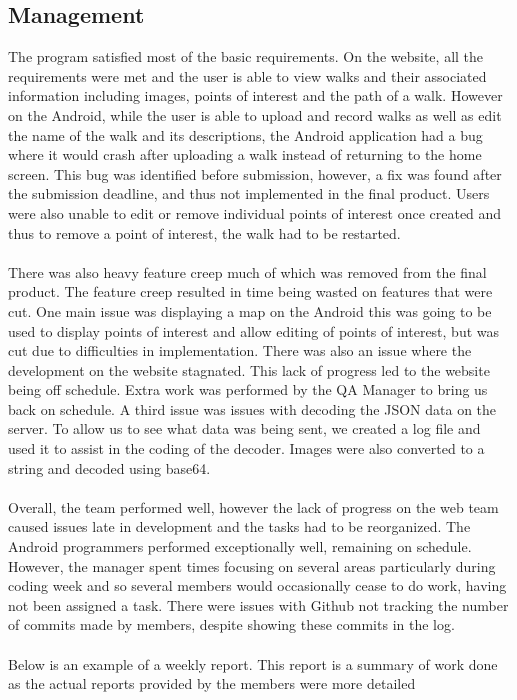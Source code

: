 \documentclass[12pt]{article}
\begin{document}
\subsection{Management}
The program satisfied most of the basic requirements. On the website, all the requirements were met and the user is able to view walks and their associated information including images, points of interest and the path of a walk. However on the Android, while the user is able to upload and record walks as well as edit the name of the walk and its descriptions, the Android application had a bug where it would crash after uploading a walk instead of returning to the home screen. This bug was identified before submission, however, a fix was found after the submission deadline, and thus not implemented in the final product. Users were also unable to edit or remove individual points of interest once created and thus to remove a point of interest, the walk had to be restarted. 
\\\\
There was also heavy feature creep much of which was removed from the final product. The feature creep resulted in time being wasted on features that were cut. One main issue was displaying a map on the Android this was going to be used to display points of interest and allow editing of points of interest, but was cut due to difficulties in implementation. There was also an issue where the development on the website stagnated. This lack of progress led to the website being off schedule. Extra work was performed by the QA Manager to bring us back on schedule. A third issue was issues with decoding the JSON data on the server. To allow us to see what data was being sent, we created a log file and used it to assist in the coding of the decoder. Images were also converted to a string and decoded using base64.
\\\\
Overall, the team performed well, however the lack of progress on the web team caused issues late in development and the tasks had to be reorganized. The Android programmers performed exceptionally well, remaining on schedule. However, the manager spent times focusing on several areas particularly during coding week and so several members would occasionally cease to do work, having not been assigned a task. There were issues with Github not tracking the number of commits made by members, despite showing these commits in the log.
\\\\
Below is an example of a weekly report. This report is a summary of work done as the actual reports provided by the members were more detailed
\end{document}
